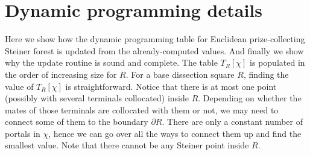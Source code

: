 \documentclass[extras,11pt]{article} \usepackage{fullpage}
\theoremstyle{mytheorem}
\begin{document}
{ 
}














\appendix



\iffalse

\section{Dynamic programming details}\label{sec:dp-details}

Here we show how the dynamic programming table for Euclidean prize-collecting Steiner forest 
is updated from the already-computed values.
And finally we show why the update routine is sound and complete.
The table $T_R[\chi]$ is populated in the order of increasing size for $R$.
For a base dissection square $R$, finding the value of $T_R[\chi]$ is straightforward.
Notice that there is at most one point (possibly with several terminals collocated) inside $R$.
Depending on whether the mates of those terminals are collocated with them or not, we may need to connect some of them to the boundary $\partial R$.
There are only a constant number of portals in $\chi$, hence we can go over all the ways to connect them up and find the smallest value.
Note that there cannot be any Steiner point inside $R$.
\end{document}
